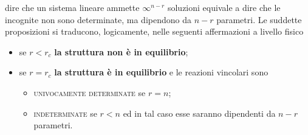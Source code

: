 \begin{enumerate}
\begin{itemize}
\begin{itemize}
\end{itemize}
\end{itemize}
dire che un sistema lineare ammette $\infty^{n-r}$ soluzioni equivale a dire che le incognite non sono determinate, ma dipendono da $n-r$ parametri. Le suddette proposizioni si traducono, logicamente, nelle seguenti affermazioni a livello fisico
\begin{itemize}
\item se $r<r_c$ \textbf{la struttura non è in equilibrio};
\item se $r=r_c$ \textbf{la struttura è in equilibrio} e le reazioni vincolari sono
\begin{itemize}
\item \textsc{univocamente determinate} se $r=n$;
\item \textsc{indeterminate} se $r<n$ ed in tal caso esse saranno dipendenti da $n-r$ parametri.
\end{itemize}
\end{itemize}
\end{enumerate}
